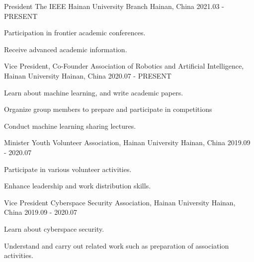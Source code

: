 

\begin{cventries}
	\cventry
	{President} %
	{The IEEE Hainan University Branch} %
	{Hainan, China} %
	{2021.03 - PRESENT} %
	{
		\begin{cvitems} %
			\item{Participation in frontier academic conferences.}
			\item{Receive advanced academic information.}
		\end{cvitems}
	}
	
	
	\cventry
	{Vice President, Co-Founder} %
	{Association of Robotics and Artificial Intelligence, Hainan University} %
	{Hainan, China} %
	{2020.07 - PRESENT} %
	{
		\begin{cvitems} %
			\item {Learn about machine learning, and write academic papers.}
			\item {Organize group members to prepare and participate in competitions}
			\item {Conduct machine learning sharing lectures.}
		\end{cvitems}
	}
	
	\cventry
	{Minister} %
	{Youth Volunteer Association, Hainan University} %
	{Hainan, China} %
	{2019.09 - 2020.07} %
	{
		\begin{cvitems} %
			\item {Participate in various volunteer activities.}
			\item {Enhance leadership and work distribution skills.}
		\end{cvitems}
	}
	
	\cventry
	{Vice President} %
	{Cyberspace Security Association, Hainan University} %
	{Hainan, China} %
	{2019.09 - 2020.07} %
	{
		\begin{cvitems} %
			\item {Learn about cyberspace security.}
			\item {Understand and carry out related work such as preparation of association activities.}
		\end{cvitems}
	}
\end{cventries}
